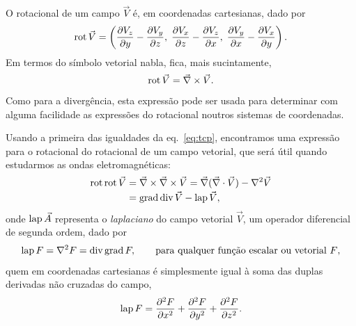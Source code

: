 O rotacional de um campo $\vec V$ é, em coordenadas cartesianas, dado por
\begin{equation}\label{eq:rotcart}
  \rot\vec V=
  \left(\pd{V_z}{y}-\pd{V_y}{z},\; \pd{V_x}{z}-\pd{V_z}{x},\;
  \pd{V_y}{x}-\pd{V_x}{y}\right).
\end{equation}
Em termos do símbolo vetorial nabla, fica, mais sucintamente,
\begin{equation}
  \rot\vec V=\vec\nabla\times\vec V.
\end{equation}
Como para a divergência, esta expressão pode ser usada para determinar com
alguma facilidade as expressões do rotacional noutros sistemas de coordenadas.

Usando a primeira das igualdades da eq.~\eqref{eq:tcp}, encontramos uma
expressão para o rotacional do rotacional de um campo vetorial, que será útil
quando estudarmos as ondas eletromagnéticas:
\begin{align}
\rot\rot \vec V&=\vec\nabla\times\vec\nabla\times\vec V=
\vec \nabla(\vec\nabla\cdot\vec V)-\nabla^2\vec V\nonumber\\
&=\grad\div \vec V-\lap\vec V,
\end{align}
onde $\lap\vec A$ representa o \emph{laplaciano} do campo vetorial $\vec V$, um
operador diferencial de segunda ordem, dado por
\begin{equation}
\text{lap}\, F = \nabla^2 F=\text{div}\,\text{grad}\, F,\qquad\text{para qualquer função escalar ou
vetorial $F$},
\end{equation}
quem em coordenadas cartesianas é simplesmente igual à soma das duplas derivadas
não cruzadas do campo,
\begin{equation}
\text{lap}\, F = 
\frac{\partial^2 F}{\partial x^2}+
\frac{\partial^2 F}{\partial y^2}+
\frac{\partial^2 F}{\partial z^2}.
\end{equation}

